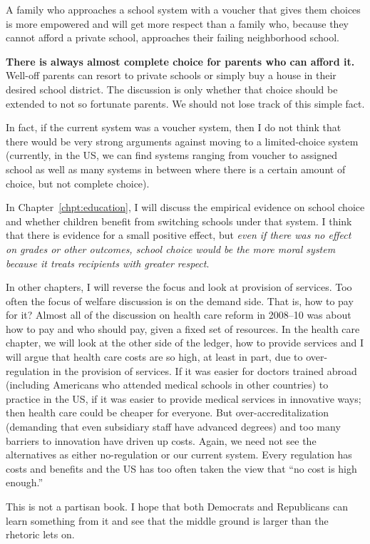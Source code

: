 A family who approaches a school system with a voucher that gives them choices
is more empowered and will get more respect than a family who, because they
cannot afford a private school, approaches their failing neighborhood school.

\textbf{There is always almost complete choice for parents who can afford it.}
Well-off parents can resort to private schools or simply buy a house in their
desired school district. The discussion is only whether that choice should be
extended to not so fortunate parents. We should not lose track of this simple
fact.

In fact, if the current system was a voucher system, then I do not think that
there would be very strong arguments against moving to a limited-choice system
(currently, in the US, we can find systems ranging from voucher to assigned
school as well as many systems in between where there is a certain amount of
choice, but not complete choice).

In Chapter~\ref{chpt:education}, I will discuss the empirical evidence on
school choice and whether children benefit from switching schools under that
system. I think that there is evidence for a small positive effect, but
\emph{even if there was no effect on grades or other outcomes, school choice
would be the more moral system because it treats recipients with greater
respect}.

In other chapters, I will reverse the focus and look at provision of services.
Too often the focus of welfare discussion is on the demand side. That is, how
to pay for it? Almost all of the discussion on health care reform in 2008--10
was about how to pay and who should pay, given a fixed set of resources. In the
health care chapter, we will look at the other side of the ledger, how to
provide services and I will argue that health care costs are so high, at least
in part, due to over-regulation in the provision of services. If it was easier
for doctors trained abroad (including Americans who attended medical schools in
other countries) to practice in the US, if it was easier to provide medical
services in innovative ways; then health care could be cheaper for everyone.
But over-accreditalization (demanding that even subsidiary staff have advanced
degrees) and too many barriers to innovation have driven up costs. Again, we
need not see the alternatives as either no-regulation or our current system.
Every regulation has costs and benefits and the US has too often taken the view
that ``no cost is high enough.''

This is not a partisan book. I hope that both Democrats and Republicans can
learn something from it and see that the middle ground is larger than the
rhetoric lets on.


